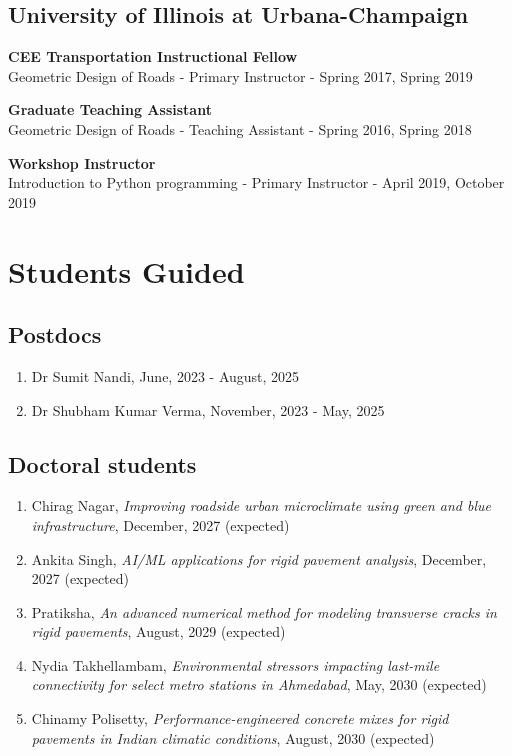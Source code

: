 \documentclass[12pt]{article}
\begin{document}
\hfill
\subsection*{University of Illinois at Urbana-Champaign}
\textbf{CEE Transportation Instructional Fellow}\\
Geometric Design of Roads - Primary Instructor - Spring 2017, Spring 2019

\textbf{Graduate Teaching Assistant}\\
Geometric Design of Roads - Teaching Assistant - Spring 2016, Spring 2018

\textbf{Workshop Instructor}\\
Introduction to Python programming - Primary Instructor - April 2019, October 2019

\bigskip
\section*{Students Guided}
\hfill
\subsection*{Postdocs}
\begin{enumerate}
	\item Dr Sumit Nandi, June, 2023 - August, 2025
	\item Dr Shubham Kumar Verma, November, 2023 - May, 2025
\end{enumerate}

\hfill
\subsection*{Doctoral students}
\begin{enumerate}
	\item Chirag Nagar, \textit{Improving roadside urban microclimate using green and blue infrastructure}, December, 2027 (expected)
	\item Ankita Singh, \textit{AI/ML applications for rigid pavement analysis}, December, 2027 (expected)
	\item Pratiksha, \textit{An advanced numerical method for modeling transverse cracks in rigid pavements}, August, 2029 (expected)
	\item Nydia Takhellambam, \textit{Environmental stressors impacting last-mile connectivity for select metro stations in Ahmedabad}, May, 2030 (expected)
	\item Chinamy Polisetty, \textit{Performance-engineered concrete mixes for rigid pavements in Indian climatic conditions}, August, 2030 (expected)
\end{enumerate}
\end{document}
